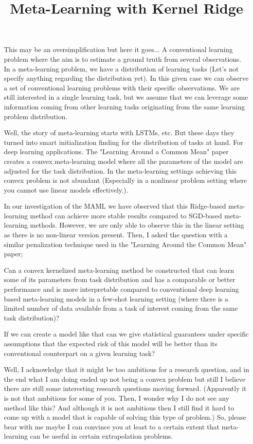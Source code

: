\documentclass{tran-l}
\title{Meta-Learning with Kernel Ridge}
\theoremstyle{definition}
\theoremstyle{remark}
\numberwithin{equation}{section}
\begin{document}
\maketitle

\rem This may be an oversimplification but here it goes...  A conventional learning problem where the aim is to estimate a ground truth from several observations. In a meta-learning problem, we have a distribution of learning tasks (Let's not specify anything regarding the distribution yet). In this given case we can observe a set of conventional learning problems with their specific observations. We are still interested in a single learning task, but we assume that we can leverage some information coming from other learning tasks originating from the same learning problem distribution. 

Well, the story of meta-learning starts with LSTMs, etc. But these days they turned into smart initialization finding for the distribution of tasks at hand. For deep learning applications. The "Learning Around a Common Mean" paper creates a convex meta-learning model where all the parameters of the model are adjusted for the task distribution. In the meta-learning settings achieving this convex problem is not abundant (Especially in a nonlinear problem setting where you cannot use linear models effectively.).


\rem In our investigation of the MAML we have observed that this Ridge-based meta-learning method can achieve more stable results compared to SGD-based meta-learning methods. However, we are only able to observe this in the linear setting as there is no non-linear version present. Then, I asked the question with a similar penalization technique used in the "Learning Around the Common Mean" paper;
 
\requ Can a convex kernelized meta-learning method be constructed that can learn some of its parameters from task distribution and has a comparable or better performance and is more interpretable compared to conventional deep learning based meta-learning models in a few-shot learning setting (where there is a limited number of data available from a task of interest coming from the same task distribution)?

\requ If we can create a model like that can we give statistical guarantees under specific assumptions that the expected risk of this model will be better than its conventional counterpart on a given learning task?

Well, I acknowledge that it might be too ambitious for a research question, and in the end what I am doing ended up not being a convex problem but still I believe there are still some interesting research questions moving forward. (Apparently it is not that ambitious for some of you. Then, I wonder why I do not see any method like this? And although it is not ambitious then I still find it hard to come up with a model that is capable of solving this type of problem.) So, please bear with me maybe I can convince you at least to a certain extent that meta-learning can be useful in certain extrapolation problems. 
\end{document}
